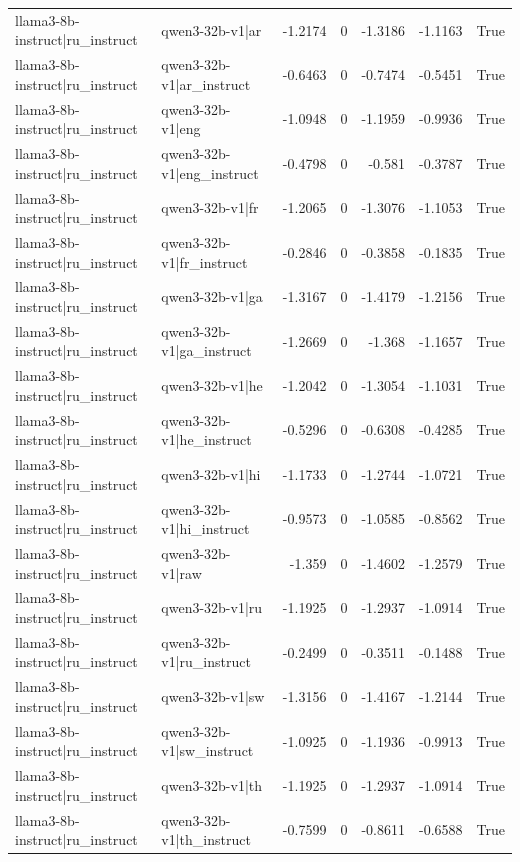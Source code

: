 \begin{table}
\begin{tabular}{l l r r r r l}
llama3-8b-instruct|ru_instruct & qwen3-32b-v1|ar & -1.2174 & 0 & -1.3186 & -1.1163 & True \\
llama3-8b-instruct|ru_instruct & qwen3-32b-v1|ar_instruct & -0.6463 & 0 & -0.7474 & -0.5451 & True \\
llama3-8b-instruct|ru_instruct & qwen3-32b-v1|eng & -1.0948 & 0 & -1.1959 & -0.9936 & True \\
llama3-8b-instruct|ru_instruct & qwen3-32b-v1|eng_instruct & -0.4798 & 0 & -0.581 & -0.3787 & True \\
llama3-8b-instruct|ru_instruct & qwen3-32b-v1|fr & -1.2065 & 0 & -1.3076 & -1.1053 & True \\
llama3-8b-instruct|ru_instruct & qwen3-32b-v1|fr_instruct & -0.2846 & 0 & -0.3858 & -0.1835 & True \\
llama3-8b-instruct|ru_instruct & qwen3-32b-v1|ga & -1.3167 & 0 & -1.4179 & -1.2156 & True \\
llama3-8b-instruct|ru_instruct & qwen3-32b-v1|ga_instruct & -1.2669 & 0 & -1.368 & -1.1657 & True \\
llama3-8b-instruct|ru_instruct & qwen3-32b-v1|he & -1.2042 & 0 & -1.3054 & -1.1031 & True \\
llama3-8b-instruct|ru_instruct & qwen3-32b-v1|he_instruct & -0.5296 & 0 & -0.6308 & -0.4285 & True \\
llama3-8b-instruct|ru_instruct & qwen3-32b-v1|hi & -1.1733 & 0 & -1.2744 & -1.0721 & True \\
llama3-8b-instruct|ru_instruct & qwen3-32b-v1|hi_instruct & -0.9573 & 0 & -1.0585 & -0.8562 & True \\
llama3-8b-instruct|ru_instruct & qwen3-32b-v1|raw & -1.359 & 0 & -1.4602 & -1.2579 & True \\
llama3-8b-instruct|ru_instruct & qwen3-32b-v1|ru & -1.1925 & 0 & -1.2937 & -1.0914 & True \\
llama3-8b-instruct|ru_instruct & qwen3-32b-v1|ru_instruct & -0.2499 & 0 & -0.3511 & -0.1488 & True \\
llama3-8b-instruct|ru_instruct & qwen3-32b-v1|sw & -1.3156 & 0 & -1.4167 & -1.2144 & True \\
llama3-8b-instruct|ru_instruct & qwen3-32b-v1|sw_instruct & -1.0925 & 0 & -1.1936 & -0.9913 & True \\
llama3-8b-instruct|ru_instruct & qwen3-32b-v1|th & -1.1925 & 0 & -1.2937 & -1.0914 & True \\
llama3-8b-instruct|ru_instruct & qwen3-32b-v1|th_instruct & -0.7599 & 0 & -0.8611 & -0.6588 & True \\

\end{tabular}
\end{table}

